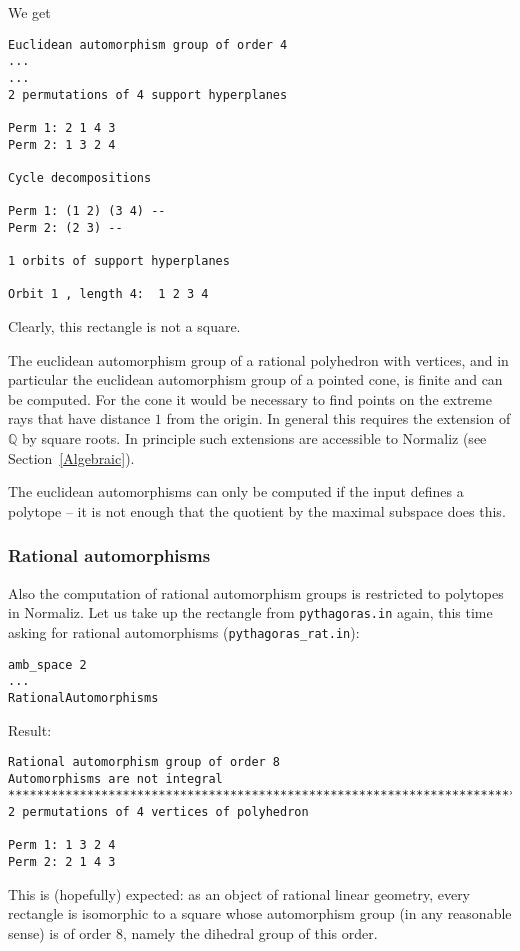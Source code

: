 \documentclass[12pt,a4paper]{scrartcl}
\theoremstyle{definition}
\def\QQ{{\mathbb Q}}
\begin{document}
We get
\begin{Verbatim}
Euclidean automorphism group of order 4
...
...
2 permutations of 4 support hyperplanes

Perm 1: 2 1 4 3
Perm 2: 1 3 2 4

Cycle decompositions 

Perm 1: (1 2) (3 4) --
Perm 2: (2 3) --

1 orbits of support hyperplanes

Orbit 1 , length 4:  1 2 3 4
\end{Verbatim}
Clearly, this rectangle is not a square.

The euclidean automorphism group of a rational polyhedron with vertices, and in particular the euclidean automorphism group of a pointed cone, is finite and can be computed. For the cone it would be necessary to find points on the extreme rays that have distance $1$ from the origin. In general this requires the extension of $\QQ$ by square roots. In principle such extensions are accessible to Normaliz (see Section~\ref{Algebraic}).

The euclidean automorphisms can only be computed if the input defines a polytope -- it is not enough that the quotient by the maximal subspace does this.


\subsubsection{Rational automorphisms}

Also the computation of rational automorphism groups is restricted to polytopes in Normaliz. Let us take up the rectangle from \verb|pythagoras.in| again, this time asking for rational automorphisms (\verb|pythagoras_rat.in|):
\begin{Verbatim}
amb_space 2
...
RationalAutomorphisms
\end{Verbatim}

Result:
\begin{Verbatim}
Rational automorphism group of order 8
Automorphisms are not integral
************************************************************************
2 permutations of 4 vertices of polyhedron

Perm 1: 1 3 2 4
Perm 2: 2 1 4 3
\end{Verbatim}
This is (hopefully) expected: as an object of rational linear geometry, every rectangle is isomorphic to a square whose automorphism group (in any reasonable sense) is of order $8$, namely the dihedral group of this order.
\end{document}
